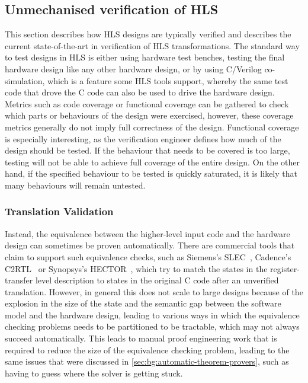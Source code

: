 \subsection{Unmechanised verification of HLS}%
\label{sec:bg:unmechanised-verification-of-hls}

This section describes how \gls{HLS} designs are typically verified and
describes the current state-of-the-art in verification of \gls{HLS}
transformations.  The standard way to test designs in \gls{HLS} is either using
hardware test benches, testing the final hardware design like any other hardware
design, or by using C/Verilog co-simulation, which is a feature some \gls{HLS}
tools support, whereby the same test code that drove the C code can also be used
to drive the hardware design.  Metrics such as code coverage or functional
coverage can be gathered to check which parts or behaviours of the design were
exercised, however, these coverage metrics generally do not imply full
correctness of the design.  Functional coverage is especially interesting, as
the verification engineer defines how much of the design should be tested.  If
the behaviour that needs to be covered is too large, testing will not be able to
achieve full coverage of the entire design.  On the other hand, if the specified
behaviour to be tested is quickly saturated, it is likely that many behaviours
will remain untested.

\subsubsection{Translation Validation}

Instead, the equivalence between the higher-level input code and the hardware
design can sometimes be proven automatically.  There are commercial tools that
claim to support such equivalence checks, such as Siemens's
SLEC~\cite[]{chauhan20_formal_ensur_equiv_c_rtl}, Cadence's
C2RTL~\cite[]{cadence23_j} or Synopsys's HECTOR~\cite{koelbl21_vcddh}, which try
to match the states in the register-transfer level description to states in the
original C code after an unverified translation.  However, in general this does
not scale to large designs because of the explosion in the size of the state and
the semantic gap between the software model and the hardware design, leading to
various ways in which the equivalence checking problems needs to be partitioned
to be tractable, which may not always succeed automatically.  This leads to
manual proof engineering work that is required to reduce the size of the
equivalence checking problem, leading to the same issues that were discussed in
\cref{sec:bg:automatic-theorem-provers}, such as having to guess where the
solver is getting stuck.


